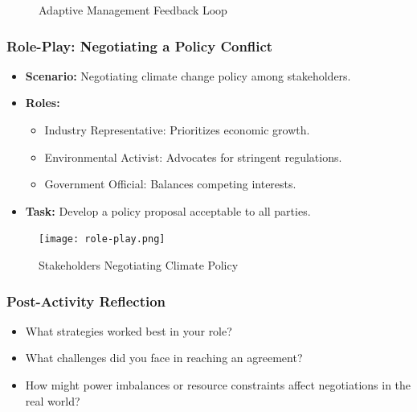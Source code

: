 \documentclass[10pt]{beamer}
\begin{document}
\begin{frame}
\begin{frame}
            \begin{figure}
                \centering
                \caption{Adaptive Management Feedback Loop}
            \end{figure}
            \end{frame}
            
            \begin{frame}
            \frametitle{Role-Play: Negotiating a Policy Conflict}
            \begin{itemize}
                \item \textbf{Scenario:} Negotiating climate change policy among stakeholders.
                \item \textbf{Roles:}
                    \begin{itemize}
                        \item Industry Representative: Prioritizes economic growth.
                        \item Environmental Activist: Advocates for stringent regulations.
                        \item Government Official: Balances competing interests.
                    \end{itemize}
                \item \textbf{Task:} Develop a policy proposal acceptable to all parties.
            \end{itemize}
            
            \begin{figure}
                \centering
                \texttt{[image: role-play.png]}
                \caption{Stakeholders Negotiating Climate Policy}
            \end{figure}
            \end{frame}
            
            \begin{frame}
            \frametitle{Post-Activity Reflection}
            \begin{itemize}
                \item What strategies worked best in your role?
                \item What challenges did you face in reaching an agreement?
                \item How might power imbalances or resource constraints affect negotiations in the real world?
            \end{itemize}
            

\end{frame}
\end{frame}
\end{document}
